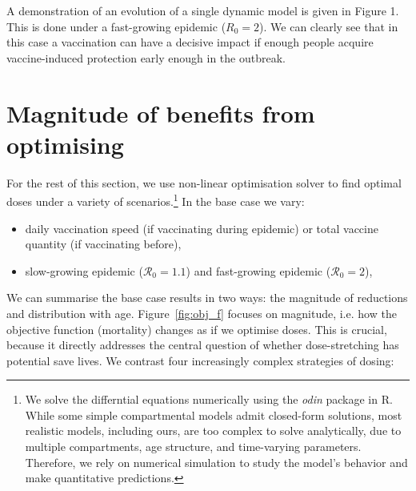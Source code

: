 \documentclass[12pt]{article}
\begin{document}
A demonstration of an evolution of a single dynamic model is given in Figure 1. This is done under a fast-growing epidemic ($R_0 = 2$). We can clearly see that in this case a vaccination can have a decisive impact if enough people acquire vaccine-induced protection early enough in the outbreak.


\section{Magnitude of benefits from optimising}

For the rest of this section, we use non-linear optimisation solver to find optimal doses under a variety of scenarios.\footnote{We solve the differntial equations numerically using the \textit{odin} package in R. While some simple compartmental models admit closed-form solutions, most realistic models, including ours, are too complex to solve analytically, due to multiple compartments, age structure, and time-varying parameters. Therefore, we rely on numerical simulation to study the model's behavior and make quantitative predictions.} In the base case we vary:


\begin{itemize}
\item daily vaccination speed (if vaccinating during epidemic) or total vaccine quantity (if vaccinating before),
\item slow-growing epidemic ($\mathcal{R}_0 = 1.1$) and fast-growing epidemic ($\mathcal{R}_0 = 2$),
\end{itemize}

We can summarise the base case results in two ways: the magnitude of reductions and distribution with age. Figure~\ref{fig:obj_f} focuses on magnitude, i.e. how the objective function (mortality) changes as if we optimise doses. This is crucial, because it directly addresses the central question of whether dose-stretching has potential save lives. We contrast four increasingly complex strategies of dosing:

\end{document}
